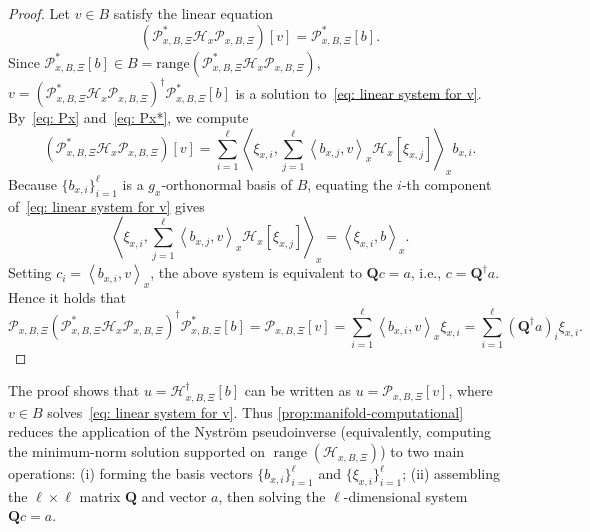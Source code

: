\documentclass[final,onefignum,onetabnum]{siamart250211}
\begin{document}
\begin{proof}
Let $v \in B$ satisfy the linear equation
\begin{equation}
  \label{eq: linear system for v}
(\mathcal{P}_{x, B, \Xi}^* \mathcal{H}_x \mathcal{P}_{x, B, \Xi})[v] = \mathcal{P}_{x, B, \Xi}^* [b].
\end{equation}
Since $\mathcal{P}_{x, B, \Xi}^*[b] \in B = \mathrm{range}(\mathcal{P}_{x, B, \Xi}^* \mathcal{H}_x \mathcal{P}_{x, B, \Xi})$, $v = (\mathcal{P}_{x, B, \Xi}^* \mathcal{H}_x \mathcal{P}_{x, B, \Xi})^{\dagger} \mathcal{P}_{x, B, \Xi}^* [b]$ is a solution to~\eqref{eq: linear system for v}.
By~\eqref{eq: Px} and~\eqref{eq: Px*}, we compute
\begin{equation*} 
\left(\mathcal{P}_{x, B, \Xi}^{*} \mathcal{H}_x \mathcal{P}_{x, B, \Xi}\right)[v] =\sum_{i=1}^{\ell}\left\langle \xi_{x, i}, \sum_{j=1}^{\ell}\left\langle b_{x, j}, v\right\rangle_{x} \mathcal{H}_x\left[\xi_{x, j}\right]\right\rangle_{x} b_{x, i}.
\end{equation*}
Because $\{b_{x, i}\}_{i=1}^{\ell}$ is a $g_x$-orthonormal basis of $B$, equating the $i$-th component of~\eqref{eq: linear system for v} gives
\[
\left\langle \xi_{x, i}, \sum_{j=1}^{\ell}\left\langle b_{x, j}, v\right\rangle_{x} \mathcal{H}_x[\xi_{x, j}]\right\rangle_{x}  = \left\langle \xi_{x, i}, b\right\rangle_{x}.
\]
Setting $c_{i} = \left\langle b_{x, i}, v\right\rangle_{x}$, the above system is equivalent to $\mathbf{Q} c = a$, i.e., $c = \mathbf{Q}^{\dagger} a$.
Hence it holds that
\[
\mathcal{P}_{x, B, \Xi}\left(\mathcal{P}_{x, B, \Xi}^{*} \mathcal{H}_x \mathcal{P}_{x, B, \Xi}\right)^{\dagger} \mathcal{P}_{x, B, \Xi}^{*} [b] 
= \mathcal{P}_{x, B, \Xi}[v]
=\sum_{i=1}^{\ell} \left\langle b_{x, i}, v\right\rangle_{x} \xi_{x, i} 
=\sum_{i=1}^{\ell}  (\mathbf{Q}^{\dagger} a)_{i} \xi_{x, i} .
\]
\end{proof}
\begin{remark}
  \label{remark:manifold-computational-1}
  The proof shows that $u=\mathcal{H}_{x,B,\Xi}^{\dagger}[b]$ can be written as $u=\mathcal{P}_{x,B,\Xi}[v]$, where $v\in B$ solves~\eqref{eq: linear system for v}.
  Thus \cref{prop:manifold-computational} reduces the application of the Nystr\"om pseudoinverse (equivalently, computing the minimum-norm solution supported on $\operatorname{range}(\mathcal{H}_{x,B,\Xi})$) to two main operations: (i) forming the basis vectors $\{b_{x, i}\}_{i =1}^{\ell}$ and $\{\xi_{x, i}\}_{i =1}^{\ell}$; (ii) assembling the $\ell\times\ell$ matrix $\mathbf{Q}$ and vector $a$, then solving the $\ell$-dimensional system $\mathbf{Q} c = a$.
\end{remark}
\end{document}
